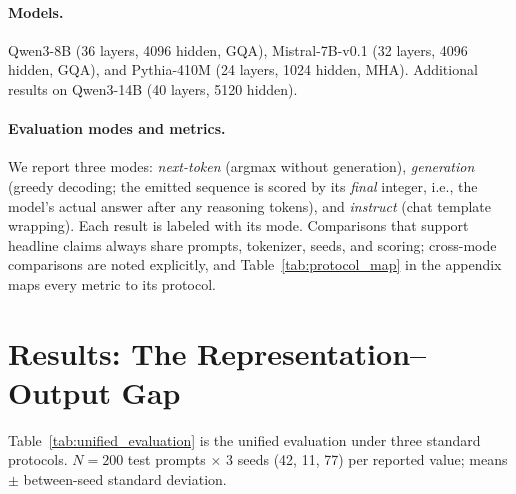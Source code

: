 \documentclass{article}
\begin{document}
\paragraph{Models.}
Qwen3-8B (36 layers, 4096 hidden, GQA), Mistral-7B-v0.1 (32 layers, 4096
hidden, GQA), and Pythia-410M (24 layers, 1024 hidden, MHA). Additional
results on Qwen3-14B (40 layers, 5120 hidden).

\paragraph{Evaluation modes and metrics.}
We report three modes: \emph{next-token} (argmax without generation),
\emph{generation} (greedy decoding; the emitted sequence is scored by its
\emph{final} integer, i.e., the model's actual answer after any reasoning
tokens), and \emph{instruct} (chat template wrapping). Each result is labeled
with its mode. Comparisons that support headline claims always share prompts,
tokenizer, seeds, and scoring; cross-mode comparisons are noted
explicitly, and Table~\ref{tab:protocol_map} in the appendix maps every metric
to its protocol.

\section{Results: The Representation--Output Gap}
\label{sec:results}

Table~\ref{tab:unified_evaluation} is the unified evaluation under three
standard protocols. $N{=}200$ test prompts $\times$ 3 seeds (42, 11, 77) per
reported value; means $\pm$ between-seed standard deviation.
\end{document}
